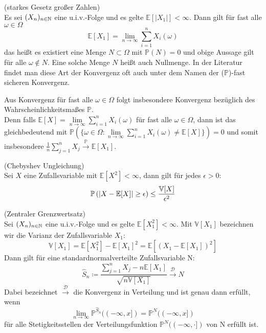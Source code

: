 \begin{Satz}(starkes Gesetz großer Zahlen)\\
	\label{starkesGgZ}
	Es sei $ (X_n)_{n \in \mathbb{N}} $ eine u.i.v.-Folge und es gelte $ \mathbb{E}[|X_1|] < \infty$. Dann gilt für fast alle $ \omega  \in \Omega$ 
	\[
		\mathbb{E}[X_1] = \lim_{n \to \infty} \sum_{i=1}^n X_i(\omega)
	\]
	das heißt es existiert eine Menge $ N \subset \Omega $ mit $ \mathbb{P}(N)=0 $ und obige Aussage gilt für alle $ \omega \not \in N $. Eine solche Menge $ N $ heißt auch Nullmenge. In der Literatur findet man diese Art der Konvergenz oft auch unter dem Namen der ($\mathbb{P}$)-fast sicheren Konvergenz.
\end{Satz} 
\begin{Bemerkung}
	Aus Konvergenz für fast alle $ \omega \in \Omega $ folgt insbesondere Konvergenz bezüglich des Wahrscheinlichkeitsmaßes $ \mathbb{P} $.\\
	 Denn falls $ \mathbb{E}[X] = \lim\limits_{n \to \infty} \sum_{i=1}^n X_i(\omega) $ für fast alle $ \omega \in \Omega $, dann ist das gleichbedeutend mit $ \mathbb{P}(\{ \omega \in \Omega:  \lim\limits_{n \to \infty} \sum_{i=1}^n X_i(\omega) \not = \mathbb{E}[X] \}) = 0 $ und somit insbesondere $ \frac{1}{n} \sum_{j=1}^n X_j \stackrel{\mathbb{P}}{\to} \mathbb{E}[X_1] $.
\end{Bemerkung}
\begin{Satz}(Chebyshev Ungleichung)\\
	\label{ChebCheb}
	Sei $ X  $ eine Zufallsvariable mit $ \mathbb{E}[X^2] < \infty $, dann gilt für jedes $ \epsilon > 0 $:
	\[
	\mathbb{P}\left( | X-\mathbb{E}[X] | \geq \epsilon \right) \leq \frac{\mathbb{V}[X]}{\epsilon^2}
	\]
\end{Satz}
\begin{Satz}(Zentraler Grenzwertsatz)\\
	\label{ZGWS}
	Sei $ (X_n)_{n \in \mathbb{N}} $ eine u.i.v.-Folge und es gelte $ \mathbb{E}[X_1^2] < \infty $.
	Mit $ \mathbb{V}[X_1] $ bezeichnen wir die Varianz der Zufallsvariable $ X_1 $:
	\[
		\mathbb{V}[X_1] = \mathbb{E}[X_1^2]-\mathbb{E}[X_1]^2 = \mathbb{E}[(X_1-\mathbb{E}[X_1])^2]
	\]
	Dann gilt für eine standardnormalverteilte Zufallsvariable N:
	\[
		\hat{S}_n \coloneqq\frac{\sum_{j=1}^{n}X_j-n\mathbb{E}[X_1]}{\sqrt{n\mathbb{V}[X_1]}} \stackrel{\mathcal{D}}{\to} N
	\]
	Dabei bezeichnet $ \stackrel{\mathcal{D}}{\to} $ die Konvergenz in Verteilung und ist genau dann erfüllt, wenn 
	\[ \lim\limits_{n \to \infty} \mathbb{P}^{\hat{S}_n}((-\infty,x]) = \mathbb{P}^N((-\infty,x])
	\]
	für alle Stetigkeitsstellen der Verteilungsfunktion $ \mathbb{P}^N((-\infty,\cdot]) $ von N erfüllt ist.
\end{Satz}


